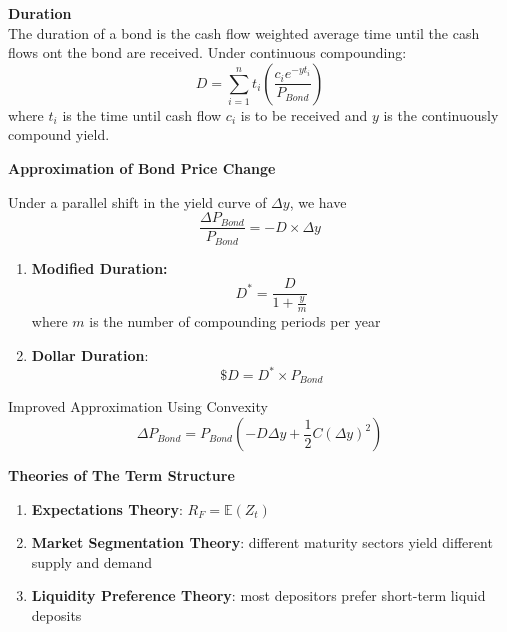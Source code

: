 \documentclass[11pt,fleqn]{report} %
\numberwithin{equation}{section} %
\numberwithin{figure}{section} %
\numberwithin{table}{section} %
\begin{document}
\begin{definition}\textbf{Duration}\\
The duration of a bond is the cash flow weighted average time until the cash flows ont the bond are received. Under continuous compounding:
$$
D=\sum_{i=1}^nt_i\left(\frac{c_ie^{-yt_i}}{P_{Bond}}\right)
$$
where $t_i$ is the time until cash flow $c_i$ is to be received and $y$ is the continuously compound yield.
\end{definition}
\begin{theorem}\textbf{Approximation of Bond Price Change}

Under a parallel shift in the yield curve of $\Delta y$, we have
$$
\frac{\Delta P_{Bond}}{P_{Bond}}=-D\times\Delta y
$$
\end{theorem}
\begin{definition}

\begin{enumerate}
    \item \textbf{Modified Duration:}
    $$
    D^*=\frac{D}{1+\frac{y}{m}}
    $$
    where $m$ is the number of compounding periods per year
    \item \textbf{Dollar Duration}:
    $$
    \$D=D^*\times P_{Bond}
    $$
\end{enumerate}
\end{definition}
\begin{theorem}Improved Approximation Using Convexity
$$
\Delta P_{Bond}= P_{Bond}\left(-D\Delta y+\frac{1}{2}C(\Delta y)^2\right)
$$
\end{theorem}
\begin{proposition}\textbf{Theories of The Term Structure}
\begin{enumerate}
    \item \textbf{Expectations Theory}: $R_F=\mathbb{E}(Z_t)$
    \item \textbf{Market Segmentation Theory}: different maturity sectors yield different supply and demand
    \item \textbf{Liquidity Preference Theory}: most depositors prefer short-term liquid deposits
\end{enumerate}

\end{proposition}
\end{document}
